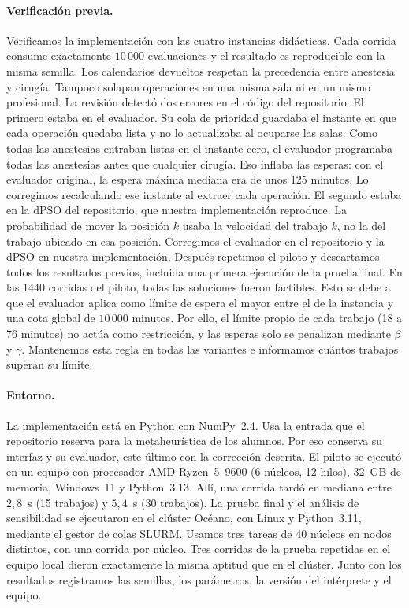 \documentclass[10pt,a4paper]{article}
\newcommand{\dc}{{,}}%
\begin{document}
\paragraph{Verificación previa.}
Verificamos la implementación con las cuatro instancias didácticas. Cada corrida consume
exactamente $10\,000$ evaluaciones y el resultado es reproducible con la misma semilla. Los
calendarios devueltos respetan la precedencia entre anestesia y cirugía. Tampoco solapan
operaciones en una misma sala ni en un mismo profesional. La revisión detectó dos errores en el
código del repositorio. El primero estaba en el evaluador. Su cola de prioridad guardaba el
instante en que cada operación quedaba lista y no lo actualizaba al ocuparse las salas. Como
todas las anestesias entraban listas en el instante cero, el evaluador programaba todas las
anestesias antes que cualquier cirugía. Eso inflaba las esperas: con el evaluador original, la
espera máxima mediana era de unos 125 minutos. Lo corregimos recalculando ese instante al
extraer cada operación. El segundo estaba en la dPSO del repositorio, que nuestra implementación
reproduce. La probabilidad de mover la posición $k$ usaba la velocidad del trabajo $k$, no la del
trabajo ubicado en esa posición. Corregimos el evaluador en el repositorio y la dPSO en nuestra
implementación. Después repetimos el piloto y descartamos todos los resultados previos, incluida
una primera ejecución de la prueba final. En las 1440 corridas
del piloto, todas las soluciones fueron factibles. Esto se debe a que el evaluador aplica como
límite de espera el mayor entre el de la instancia y una cota global de $10\,000$ minutos. Por
ello, el límite propio de cada trabajo (18 a 76 minutos) no actúa como restricción, y las
esperas solo se penalizan mediante $\beta$ y $\gamma$. Mantenemos esta regla en todas las
variantes e informamos cuántos trabajos superan su límite.

\paragraph{Entorno.}
La implementación está en Python con NumPy~2.4. Usa la entrada que el repositorio reserva
para la metaheurística de los alumnos. Por eso conserva su interfaz y su evaluador, este último
con la corrección descrita. El piloto se ejecutó en un equipo con procesador AMD
Ryzen~5~9600 (6 núcleos, 12 hilos), 32~GB de memoria, Windows~11 y Python~3.13. Allí, una corrida
tardó en mediana entre $2\dc8$~s (15 trabajos) y $5\dc4$~s (30 trabajos). La prueba final y el análisis de sensibilidad se ejecutaron en el clúster Océano, con
Linux y Python~3.11, mediante el gestor de colas SLURM. Usamos tres tareas de 40 núcleos en
nodos distintos, con una corrida por núcleo. Tres corridas de la prueba repetidas en el equipo
local dieron exactamente la misma aptitud que en el clúster. Junto con los resultados
registramos las semillas, los parámetros, la versión del intérprete y el equipo.
\end{document}
